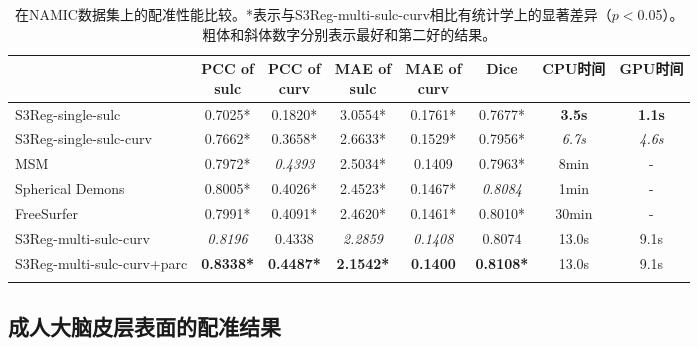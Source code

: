 \begin{table}[h]
		\caption{在NAMIC数据集上的配准性能比较。*表示与S3Reg-multi-sulc-curv相比有统计学上的显著差异（$p<$0.05）。粗体和斜体数字分别表示最好和第二好的结果。}
		\label{tab:NAMIC成人数据集的配准结果比较}
		\centering
		\begin{tabularx}{\linewidth}{lccccccc}
			\Xhline{2\arrayrulewidth}
			&       \makecell{PCC of\\ sulc}         &     \makecell{PCC of\\ curv}          &     \makecell{MAE of\\ sulc}  &         \makecell{MAE of\\ curv}     & Dice                     & CPU时间 & GPU时间 \\
			\hline
			S3Reg-single-sulc           &   0.7025*	        &   0.1820*	        &  3.0554*	       &  0.1761*	     &   0.7677*	        &    \textbf{3.5s} & \textbf{1.1s} \\
			S3Reg-single-sulc-curv      &	0.7662*	        &  0.3658*           &  	2.6633*         &   0.1529*	     &   0.7956*	        &   \textit{6.7s}  &\textit{4.6s}   \\
			MSM\cite{robinson2014msm}                       &	0.7972*	        &   \textit{0.4393}  &   2.5034*	       &   0.1409	     &   0.7963*	        &   8min           &  -            \\
			Spherical Demons\cite{yeo2009spherical}	        &    0.8005*         &	0.4026*          &   	2.4523*	   &   0.1467*	     &   \textit{0.8084} &   1min           & -             \\
		   FreeSurfer\cite{fischl2012freesurfer}     &    0.7991*         &	0.4091*          &   	2.4620*	   &   0.1461*    &   0.8010* &   30min       & -       \\
			S3Reg-multi-sulc-curv	    &   \textit{0.8196}	&   0.4338           &  	\textit{2.2859} & \textit{0.1408}	 &   0.8074	        &   13.0s          &   9.1s        \\
			S3Reg-multi-sulc-curv+parc	& 	\textbf{0.8338*}	& \textbf{0.4487*}	& \textbf{2.1542*}  & \textbf{0.1400}  & \textbf{0.8108*}  &   13.0s          &   9.1s        \\		
			\Xhline{2\arrayrulewidth}
		\end{tabularx}
\end{table}

\subsection{成人大脑皮层表面的配准结果}

